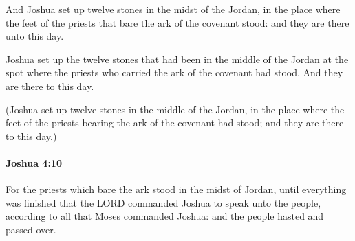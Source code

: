 			\begin{versebox}
					\item[BHS] 
					\item[ASV] And Joshua set up twelve stones in the midst of the Jordan, in the place where the feet of the priests that bare the ark of the covenant stood: and they are there unto this day.
					\item[NIV] Joshua set up the twelve stones that had been in the middle of the Jordan at the spot where the priests who carried the ark of the covenant had stood. And they are there to this day.
					\item[NRSV] (Joshua set up twelve stones in the middle of the Jordan, in the place where the feet of the priests bearing the ark of the covenant had stood; and they are there to this day.)
			\end{versebox}

		\paragraph{Joshua 4:10} %
			\label{JOSHUA-4-10}

			For the priests which bare the ark stood in the midst of Jordan, until everything was finished that the LORD commanded Joshua to speak unto the people, according to all that Moses commanded Joshua: and the people hasted and passed over.

